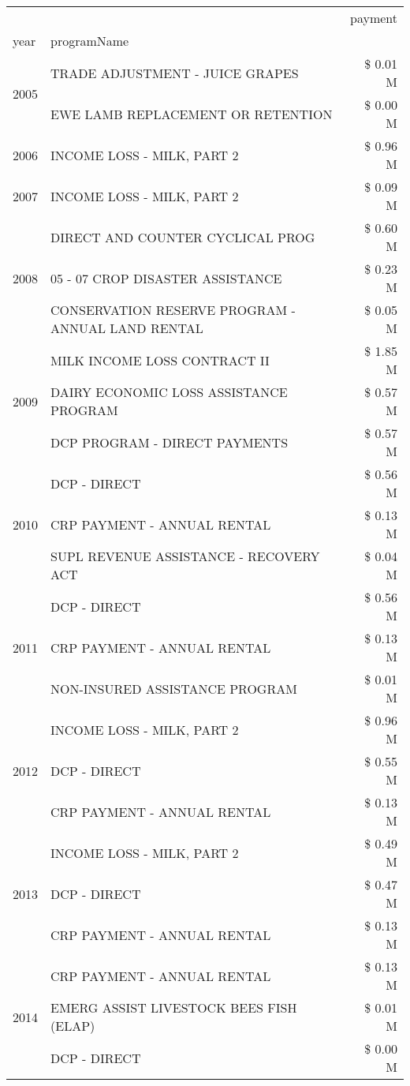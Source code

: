 \begin{tabular}{llr}
\toprule
 &  & payment \\
year & programName &  \\
\midrule
\multirow[t]{2}{*}{2005} & TRADE ADJUSTMENT - JUICE GRAPES & \$ 0.01 M \\
 & EWE LAMB REPLACEMENT OR RETENTION & \$ 0.00 M \\
\cline{1-3}
2006 & INCOME LOSS - MILK, PART 2 & \$ 0.96 M \\
\cline{1-3}
2007 & INCOME LOSS - MILK, PART 2 & \$ 0.09 M \\
\cline{1-3}
\multirow[t]{3}{*}{2008} & DIRECT AND COUNTER CYCLICAL PROG & \$ 0.60 M \\
 & 05 - 07 CROP DISASTER ASSISTANCE & \$ 0.23 M \\
 & CONSERVATION RESERVE PROGRAM - ANNUAL LAND RENTAL & \$ 0.05 M \\
\cline{1-3}
\multirow[t]{3}{*}{2009} & MILK INCOME LOSS CONTRACT II & \$ 1.85 M \\
 & DAIRY ECONOMIC LOSS ASSISTANCE PROGRAM & \$ 0.57 M \\
 & DCP PROGRAM - DIRECT PAYMENTS & \$ 0.57 M \\
\cline{1-3}
\multirow[t]{3}{*}{2010} & DCP - DIRECT & \$ 0.56 M \\
 & CRP PAYMENT - ANNUAL RENTAL & \$ 0.13 M \\
 & SUPL REVENUE ASSISTANCE - RECOVERY ACT & \$ 0.04 M \\
\cline{1-3}
\multirow[t]{3}{*}{2011} & DCP - DIRECT & \$ 0.56 M \\
 & CRP PAYMENT - ANNUAL RENTAL & \$ 0.13 M \\
 & NON-INSURED ASSISTANCE PROGRAM & \$ 0.01 M \\
\cline{1-3}
\multirow[t]{3}{*}{2012} & INCOME LOSS - MILK, PART 2 & \$ 0.96 M \\
 & DCP - DIRECT & \$ 0.55 M \\
 & CRP PAYMENT - ANNUAL RENTAL & \$ 0.13 M \\
\cline{1-3}
\multirow[t]{3}{*}{2013} & INCOME LOSS - MILK, PART 2 & \$ 0.49 M \\
 & DCP - DIRECT & \$ 0.47 M \\
 & CRP PAYMENT - ANNUAL RENTAL & \$ 0.13 M \\
\cline{1-3}
\multirow[t]{3}{*}{2014} & CRP PAYMENT - ANNUAL RENTAL & \$ 0.13 M \\
 & EMERG ASSIST LIVESTOCK BEES FISH (ELAP) & \$ 0.01 M \\
 & DCP - DIRECT & \$ 0.00 M \\

\end{tabular}
